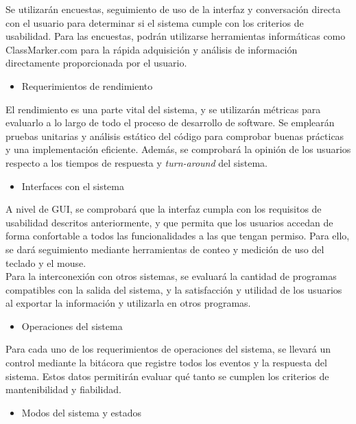\documentclass{scrreprt}
\begin{document}
Se utilizarán encuestas, seguimiento de uso de la interfaz y conversación directa con el usuario para determinar si el sistema cumple con los criterios de usabilidad. Para las encuestas, podrán utilizarse herramientas informáticas como ClassMarker.com para la rápida adquisición y análisis de información directamente proporcionada por el usuario.

\begin{itemize}
\item Requerimientos de rendimiento
\end{itemize}

El rendimiento es una parte vital del sistema, y se utilizarán métricas para evaluarlo a lo largo de todo el proceso de desarrollo de software. Se emplearán pruebas unitarias y análisis estático del código para comprobar buenas prácticas y una implementación eficiente. Además, se comprobará la opinión de los usuarios respecto a los tiempos de respuesta y \textit{turn-around} del sistema.

\begin{itemize}
\item Interfaces con el sistema
\end{itemize}

A nivel de GUI, se comprobará que la interfaz cumpla con los requisitos de usabilidad descritos anteriormente, y que permita que los usuarios accedan de forma confortable a todos las funcionalidades a las que tengan permiso. Para ello, se dará seguimiento mediante herramientas de conteo y medición de uso del teclado y el mouse.\\

Para la interconexión con otros sistemas, se evaluará la cantidad de programas compatibles con la salida del sistema, y la satisfacción y utilidad de los usuarios al exportar la información y utilizarla en otros programas.

\begin{itemize}
\item Operaciones del sistema
\end{itemize}

Para cada uno de los requerimientos de operaciones del sistema, se llevará un control mediante la bitácora que registre todos los eventos y la respuesta del sistema. Estos datos permitirán evaluar qué tanto se cumplen los criterios de mantenibilidad y fiabilidad. 

\begin{itemize}
\item Modos del sistema y estados
\end{itemize}
\end{document}
